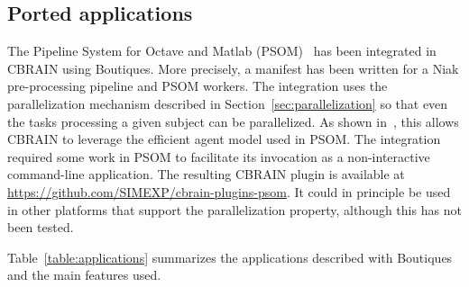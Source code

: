 \documentclass{article}
\begin{document}
\subsection{Ported applications}


The Pipeline System for Octave and Matlab
(PSOM)~\cite{bellec2012pipeline} has been integrated in CBRAIN using
Boutiques. More precisely, a manifest has been written for a Niak
pre-processing pipeline and PSOM workers. The integration uses the
parallelization mechanism described in
Section~\ref{sec:parallelization} so that even the tasks processing a
given subject can be parallelized. As shown in~\cite{GLAT-16}, this
allows CBRAIN to leverage the efficient agent model used in PSOM. The
integration required some work in PSOM to facilitate its invocation as
a non-interactive command-line application. The resulting CBRAIN
plugin is available at
\url{https://github.com/SIMEXP/cbrain-plugins-psom}. It could in
principle be used in other platforms that support the parallelization
property, although this has not been tested.


Table~\ref{table:applications} summarizes the applications described
with Boutiques and the main features used.
\end{document}
